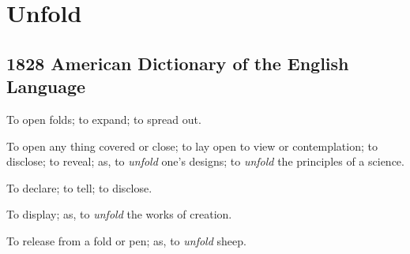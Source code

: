 \section{Unfold}
	\label{UNFOLD}
	

\subsection{1828 American Dictionary of the English Language} %
	\label{UNFOLD-1828}

	\begin{compactitem}
		\item[1] To open folds; to expand; to spread out.
		\item[2] To open any thing covered or close; to lay open to view or contemplation; to disclose; to reveal; as, to \textit{unfold} one's designs; to \textit{unfold} the principles of a science.
		\item[3] To declare; to tell; to disclose.
		\item[4] To display; as, to \textit{unfold} the works of creation.
		\item[5] To release from a fold or pen; as, to \textit{unfold} sheep.
	\end{compactitem}


	

